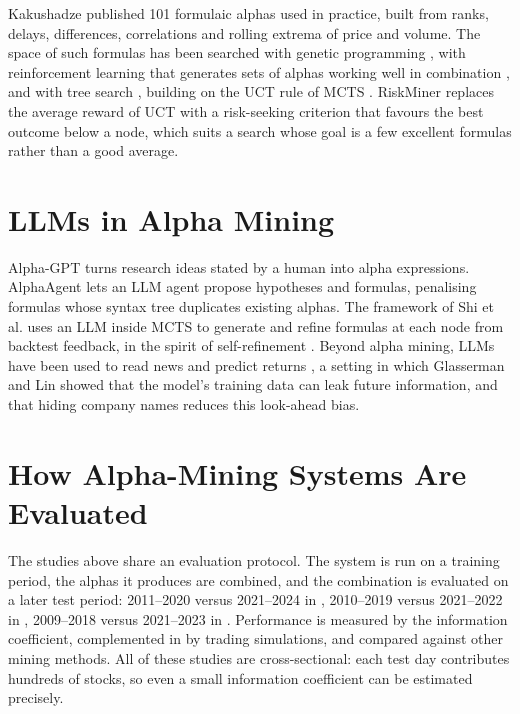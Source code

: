 \documentclass[12pt,a4paper,oneside]{book}
\theoremstyle{definition}
\begin{document}
Kakushadze \cite{kakushadze2016} published 101 formulaic alphas used in practice, built from ranks, delays, differences, correlations and rolling extrema of price and volume. The space of such formulas has been searched with genetic programming \cite{koza1992}, with reinforcement learning that generates sets of alphas working well in combination \cite{yu2023}, and with tree search \cite{xu2024,ren2024}, building on the UCT rule of MCTS \cite{kocsis2006,browne2012}. RiskMiner \cite{ren2024} replaces the average reward of UCT with a risk-seeking criterion that favours the best outcome below a node, which suits a search whose goal is a few excellent formulas rather than a good average.

\section{LLMs in Alpha Mining}

Alpha-GPT \cite{wang2023} turns research ideas stated by a human into alpha expressions. AlphaAgent \cite{tang2025} lets an LLM agent propose hypotheses and formulas, penalising formulas whose syntax tree duplicates existing alphas. The framework of Shi et al. \cite{shi2026} uses an LLM inside MCTS to generate and refine formulas at each node from backtest feedback, in the spirit of self-refinement \cite{madaan2023}. Beyond alpha mining, LLMs have been used to read news and predict returns \cite{lopezlira2023}, a setting in which Glasserman and Lin \cite{glasserman2023} showed that the model's training data can leak future information, and that hiding company names reduces this look-ahead bias.

\section{How Alpha-Mining Systems Are Evaluated}

The studies above share an evaluation protocol. The system is run on a training period, the alphas it produces are combined, and the combination is evaluated on a later test period: 2011--2020 versus 2021--2024 in \cite{shi2026}, 2010--2019 versus 2021--2022 in \cite{ren2024}, 2009--2018 versus 2021--2023 in \cite{xu2024}. Performance is measured by the information coefficient, complemented in \cite{shi2026,ren2024} by trading simulations, and compared against other mining methods. All of these studies are cross-sectional: each test day contributes hundreds of stocks, so even a small information coefficient can be estimated precisely.
\end{document}
